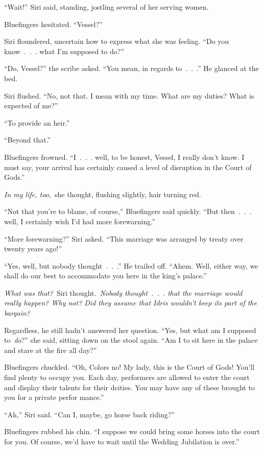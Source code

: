 “Wait!” Siri said, standing, jostling several of her serving women.

Bluefingers hesitated. “Vessel?”

Siri floundered, uncertain how to express what she was feeling. “Do you know~.~.~. what I’m supposed to do?”

“Do, Vessel?” the scribe asked. “You mean, in regards to~.~.~.” He glanced at the bed.

Siri flushed. “No, not that. I mean with my time. What are my duties? What is expected of me?”

“To provide an heir.”

“Beyond that.”

Bluefingers frowned. “I~.~.~. well, to be honest, Vessel, I really don’t know. I must say, your arrival has certainly caused a level of disruption in the Court of Gods.”

\textit{In my life, too,}~she thought, flushing slightly, hair turning red.

“Not that you’re to blame, of course,” Bluefingers said quickly. “But then~.~.~. well, I certainly wish I’d had more forewarning.”

“More forewarning?” Siri asked. “This marriage was arranged by treaty over twenty years ago!”

“Yes, well, but nobody thought~.~.~.” He trailed off. “Ahem. Well, either way, we shall do our best to accommodate you here in the king’s palace.”

\textit{What was that?}~Siri thought.~\textit{Nobody thought~.~.~. that the marriage would really happen? Why not? Did they assume that Idris wouldn’t keep its part of the bargain?}

Regardless, he still hadn’t answered her question. “Yes, but what am I supposed to~\textit{do}?” she said, sitting down on the stool again. “Am I to sit here in the palace and stare at the fire all day?”

Bluefingers chuckled. “Oh, Colors no! My lady, this is the Court of Gods! You’ll find plenty to occupy you. Each day, performers are allowed to enter the court and display their talents for their deities. You may have any of these brought to you for a private perfor mance.”

“Ah,” Siri said. “Can I, maybe, go horse back riding?”

Bluefingers rubbed his chin. “I suppose we could bring some horses into the court for you. Of course, we’d have to wait until the Wedding Jubilation is over.”

